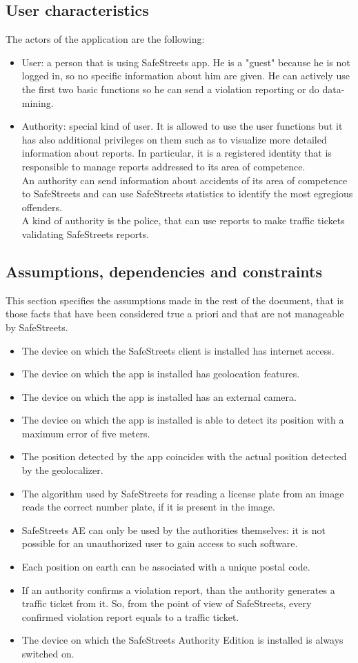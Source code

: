 \documentclass{article}
\newcommand\assumption[1]{\item[{[A#1]}] }
\begin{document}
		\subsection{User characteristics}
			The actors of the application are the following:
			\begin{itemize}
				\item User: a person that is using SafeStreets app. He is a "guest" because he is not logged in, so no specific information about him are given. He can actively use the first two basic functions so he can send a violation reporting or do data-mining.
				\item Authority: special kind of user. It is allowed to use the user functions but it has also additional privileges on them such as to visualize more detailed information about reports. In particular, it is a registered identity that is responsible to manage reports addressed to its area of competence.\\
				An authority can send information about accidents of its area of competence to SafeStreets and can use SafeStreets statistics to identify the most egregious offenders.\\
		        A kind of authority is the police, that can use reports to make traffic tickets validating SafeStreets reports.
			\end{itemize}
		
		\subsection{Assumptions, dependencies and constraints}	\label{assumptions}
			This section specifies the assumptions made in the rest of the document, that is those facts that have been considered true a priori and that are not manageable by SafeStreets.
			\begin{itemize}
				\assumption{1} The device on which the SafeStreets client is installed has internet access.
				\assumption{2} The device on which the app is installed has geolocation features.
				\assumption{3} The device on which the app is installed has an external camera.
				\assumption{4} The device on which the app is installed is able to detect its position with a maximum error of five meters.
				\assumption{5} The position detected by the app coincides with the actual position detected by the geolocalizer.
				\assumption{6} The algorithm used by SafeStreets for reading a license plate from an image reads the correct number plate, if it is present in the image.
				\assumption{7} SafeStreets AE can only be used by the authorities themselves: it is not possible for an unauthorized user to gain access to such software.
				\assumption{8} Each position on earth can be associated with a unique postal code.
				\assumption{9} If an authority confirms a violation report, than the authority generates a traffic ticket from it. So, from the point of view of SafeStreets, every confirmed violation report equals to a traffic ticket.
				\assumption{10} The device on which the SafeStreets Authority Edition is installed is always switched on.
			\end{itemize}
	
\end{document}
